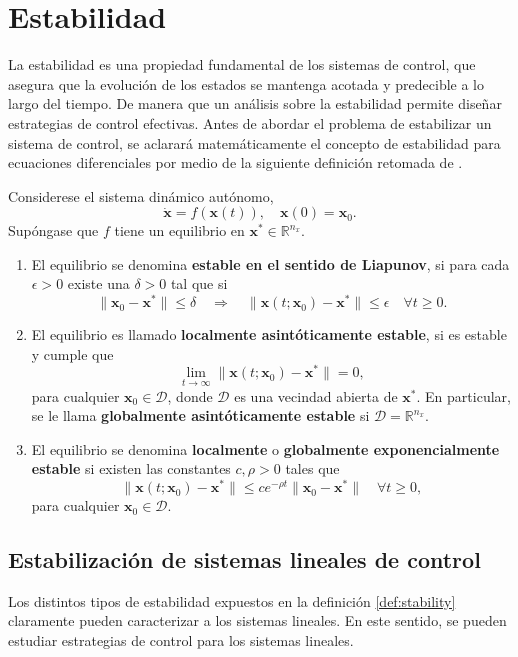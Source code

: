 \section{Estabilidad}
\label{sec:stability}
La estabilidad es una propiedad fundamental de los sistemas de control, que asegura que la evolución de los estados se mantenga acotada y predecible a lo largo del tiempo. De manera que un análisis sobre la estabilidad permite diseñar estrategias de control efectivas. Antes de abordar el problema de estabilizar un sistema de control, se aclarará matemáticamente el concepto de estabilidad para ecuaciones diferenciales por medio de la siguiente definición retomada de \cite{Gruene2021}.

\begin{definition}
\label{def:stability}
    Considerese el sistema dinámico autónomo, 
$$\dot{\mathbf{x}} = f(\mathbf{x}(t)), \quad \mathbf{x}(0)=\mathbf{x}_0.$$
Supóngase que $f$ tiene un equilibrio en $\mathbf{x}^{*}\in \mathbb{R}^{n_x}$. 
\begin{enumerate}
    \item El equilibrio se denomina \textbf{estable en el sentido de Liapunov}, si para cada $\epsilon> 0$ existe una $\delta>0$ tal que si 
    $$\|\mathbf{x}_0-\mathbf{x}^{*}\|\leq \delta \quad \Rightarrow \quad \|\mathbf{x}(t; \mathbf{x}_0) -\mathbf{x}^{*}\|\leq \epsilon \quad \forall t\geq 0.$$
    \item El equilibrio es llamado \textbf{localmente asintóticamente estable}, si es estable y cumple que 
    $$\lim_{t\rightarrow\infty}\|\mathbf{x}(t;\mathbf{x}_0)-\mathbf{x}^{*}\|=0,$$
    para cualquier $\mathbf{x}_0\in\mathcal{D}$, donde $\mathcal{D}$ es una vecindad abierta de $\mathbf{x}^{*}$. En particular, se le llama \textbf{globalmente asintóticamente estable} si $\mathcal{D}=\mathbb{R}^{n_x}$.
    \item El equilibrio se denomina \textbf{localmente} o \textbf{globalmente exponencialmente estable} si existen las constantes $c, \rho >0$ tales que 
    $$\|\mathbf{x}(t;\mathbf{x}_0)-\mathbf{x}^{*}\| \leq ce^{-\rho t}\|\mathbf{x}_0-\mathbf{x}^{*}\| \quad \forall t\geq 0,$$
    para cualquier $\mathbf{x}_0\in\mathcal{D}$.
\end{enumerate}
\end{definition}

\subsection{Estabilización de sistemas lineales de control}
Los distintos tipos de estabilidad expuestos en la definición 
\ref{def:stability} claramente pueden caracterizar a los sistemas lineales. En este sentido, se pueden estudiar estrategias de control para los sistemas lineales. 

